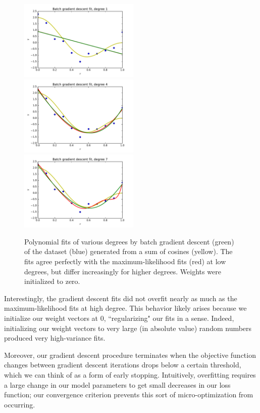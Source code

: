 \documentclass{article}
\begin{document}
\begin{multicols}{2}
\begin{figure}[h]
   \centering
   \includegraphics[width=2.25in]{img/2-3_bgd_fit_degree1.pdf}
   \includegraphics[width=2.25in]{img/2-3_bgd_fit_degree4.pdf}
   \includegraphics[width=2.25in]{img/2-3_bgd_fit_degree7.pdf}
   \caption{Polynomial fits of various degrees by batch gradient descent (green) of the dataset (blue) generated from a sum of cosines (yellow).
   The fits agree perfectly with the maximum-likelihood fits (red) at low degrees, but differ increasingly for higher degrees.
   Weights were initialized to zero.
   }
   \label{fig:bgd-poly-fits}
\end{figure}

Interestingly, the gradient descent fits did not overfit nearly as much as the maximum-likelihood fits at high degree.
This behavior likely arises because we initialize our weight vectors at 0, ``regularizing" our fits in a sense.
Indeed, initializing our weight vectors to very large (in absolute value) random numbers produced very high-variance fits.

Moreover, our gradient descent procedure terminates when the objective function changes between gradient descent iterations drops below a certain threshold, which we can think of as a form of early stopping.
Intuitively, overfitting requires a large change in our model parameters to get small decreases in our loss function; our convergence criterion prevents this sort of micro-optimization from occurring.


\end{multicols}
\end{document}
